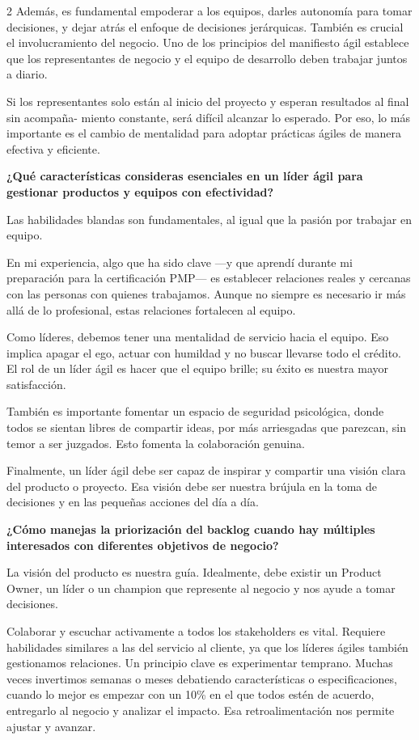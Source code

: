 \documentclass[12pt,spanish,Letterpaper,openany]{book}
\begin{document}
\begin {multicols}{2}
Además, es fundamental empoderar a los equipos, darles autonomía para tomar decisiones, y dejar atrás el enfoque de decisiones jerárquicas. También es crucial el involucramiento del negocio. Uno de los principios del manifiesto ágil establece que los representantes de negocio y el equipo de desarrollo deben trabajar juntos a diario.

Si los representantes solo están al inicio del proyecto y esperan resultados al final sin acompaña-
miento constante, será difícil alcanzar lo esperado. Por eso, lo más importante es el cambio de mentalidad para adoptar prácticas ágiles de manera efectiva y eficiente.

\textbf{¿Qué características consideras esenciales en un líder ágil para gestionar productos y equipos con efectividad?}

Las habilidades blandas son fundamentales, al igual que la pasión por trabajar en equipo.

En mi experiencia, algo que ha sido clave ---y que aprendí durante mi preparación para la certificación PMP--- es establecer relaciones reales y cercanas con las personas con quienes trabajamos. Aunque no siempre es necesario ir más allá de lo profesional, estas relaciones fortalecen al equipo.

Como líderes, debemos tener una mentalidad de servicio hacia el equipo. Eso implica apagar el ego, actuar con humildad y no buscar llevarse todo el crédito. El rol de un líder ágil es hacer que el equipo brille; su éxito es nuestra mayor satisfacción.

También es importante fomentar un espacio de seguridad psicológica, donde todos se sientan libres de compartir ideas, por más arriesgadas que parezcan, sin temor a ser juzgados. Esto fomenta la colaboración genuina.

Finalmente, un líder ágil debe ser capaz de inspirar y compartir una visión clara del producto o proyecto. Esa visión debe ser nuestra brújula en la toma de decisiones y en las pequeñas acciones del día a día.

\textbf{¿Cómo manejas la priorización del backlog cuando hay múltiples interesados con diferentes objetivos de negocio?}

La visión del producto es nuestra guía. Idealmente, debe existir un Product Owner, un líder o un champion que represente al negocio y nos ayude a tomar decisiones.

Colaborar y escuchar activamente a todos los stakeholders es vital. Requiere habilidades similares a las del servicio al cliente, ya que los líderes ágiles también gestionamos relaciones.
Un principio clave es experimentar temprano. Muchas veces invertimos semanas o meses debatiendo características o especificaciones, cuando lo mejor es empezar con un 10\% en el que todos estén de acuerdo, entregarlo al negocio y analizar el impacto. Esa retroalimentación nos permite ajustar y avanzar.


\end{multicols}
\end{document}
